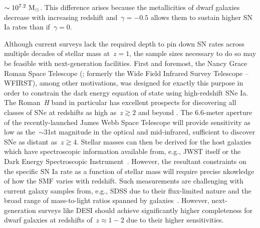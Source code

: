 \documentclass[ms.tex]{subfiles}
\begin{document}
$\sim 10^{7.2}~\text{M}_\odot$.
This difference arises because the metallicities of dwarf galaxies decrease
with increasing redshift and~$\gamma = -0.5$ allows them to sustain higher
SN Ia rates than if~$\gamma = 0$.
\par
Although current surveys lack the required depth to pin down SN rates across
multiple decades of stellar mass at~$z = 1$, the sample sizes necessary to do
so may be feasible with next-generation facilities.
First and foremost, the Nancy Grace Roman Space Telescope (\citealp{Spergel2013,
Spergel2015}; formerly the Wide Field Infrared Survey Telescope -- WFIRST),
among other motivations, was designed for exactly this purpose in order to
constrain the dark energy equation of state using high-redshift SNe Ia.
The Roman~\textit{H} band in particular has excellent prospects for discovering
all classes of SNe at redshifts as high as~$z \gtrsim 2$ and beyond
\citep{Petrushevska2016}.
The 6.6-meter aperture of the recently-launched James Webb Space Telescope
\citep[JWST;][]{Gardner2006} will provide sensitivity as low as the~$\sim$31st
magnitude in the optical and mid-infrared, sufficient to discover SNe as
distant as~$z \gtrsim 4$.
Stellar masses can then be derived for the host galaxies which have
spectroscopic information available from, e.g., JWST itself or the Dark Energy
Spectroscopic Instrument~\citep[DESI;][]{Desi2016}.
However, the resultant constraints on the specific SN Ia rate as a function of
stellar mass will require precise nkowledge of how the SMF varies with redshift.
Such measurements are challenging with current galaxy samples from, e.g.,
SDSS due to their flux-limited nature and the broad range of mass-to-light
ratios spanned by galaxies~\citep*{Weigel2016}.
However, next-generation surveys like DESI should achieve significantly higher
completeness for dwarf galaxies at redshifts of~$z \approx 1 - 2$ due to their
higher sensitivities.
\end{document}
